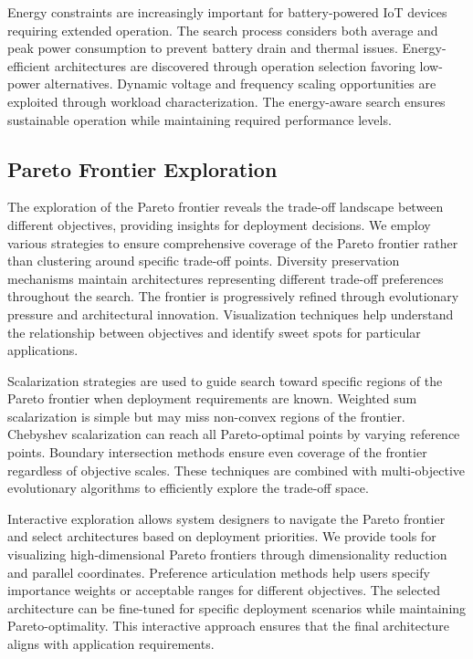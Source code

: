 \documentclass[journal]{IEEEtran}
\begin{document}
Energy constraints are increasingly important for battery-powered IoT devices requiring extended operation. The search process considers both average and peak power consumption to prevent battery drain and thermal issues. Energy-efficient architectures are discovered through operation selection favoring low-power alternatives. Dynamic voltage and frequency scaling opportunities are exploited through workload characterization. The energy-aware search ensures sustainable operation while maintaining required performance levels.

\subsection{Pareto Frontier Exploration}

The exploration of the Pareto frontier reveals the trade-off landscape between different objectives, providing insights for deployment decisions. We employ various strategies to ensure comprehensive coverage of the Pareto frontier rather than clustering around specific trade-off points. Diversity preservation mechanisms maintain architectures representing different trade-off preferences throughout the search. The frontier is progressively refined through evolutionary pressure and architectural innovation. Visualization techniques help understand the relationship between objectives and identify sweet spots for particular applications.

Scalarization strategies are used to guide search toward specific regions of the Pareto frontier when deployment requirements are known. Weighted sum scalarization is simple but may miss non-convex regions of the frontier. Chebyshev scalarization can reach all Pareto-optimal points by varying reference points. Boundary intersection methods ensure even coverage of the frontier regardless of objective scales. These techniques are combined with multi-objective evolutionary algorithms to efficiently explore the trade-off space.

Interactive exploration allows system designers to navigate the Pareto frontier and select architectures based on deployment priorities. We provide tools for visualizing high-dimensional Pareto frontiers through dimensionality reduction and parallel coordinates. Preference articulation methods help users specify importance weights or acceptable ranges for different objectives. The selected architecture can be fine-tuned for specific deployment scenarios while maintaining Pareto-optimality. This interactive approach ensures that the final architecture aligns with application requirements.
\end{document}
